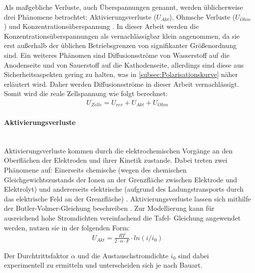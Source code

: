 Als maßgebliche Verluste, auch Überspannungen genannt, werden üblicherweise drei Phänomene betrachtet: Aktivierungsverluste ($U_{Akt}$), Ohmsche Verluste ($U_{Ohm}$) und Konzentrationsüberspannung \citep{falcao_review_2020}. In dieser Arbeit werden die Konzentrationsüberspannungen als vernachlässigbar klein angenommen, da sie erst außerhalb der üblichen Betriebsgrenzen von signifikanter Größenordnung sind. Ein weiteres Phänomen sind Diffusionsströme von Wasserstoff auf die Anodenseite und von Sauerstoff auf die Kathodenseite, allerdings sind diese aus Sicherheitsaspekten gering zu halten, was in \ref{subsec:Polarisationskurve} näher erläutert wird. Daher werden Diffusionsströme in dieser Arbeit vernachlässigt. Somit wird die reale Zellspannung wie folgt berechnet:\\

\begin{align}
	\label{gl:U_realEL}
	U_{Zelle} =  U_{rev} + U_{Akt} + U_{Ohm}
\end{align}   

\paragraph{Aktivierungsverluste}\ \\ 
Aktivierungsverluste kommen durch die elektrochemischen Vorgänge an den Oberflächen der Elektroden und ihrer Kinetik zustande. Dabei treten zwei Phänomene auf:  Einerseits chemische (wegen des chemischen Gleichgewichtszustands der Ionen an der Grenzfläche zwischen Elektrode und Elektrolyt) und andererseits elektrische (aufgrund des Ladungstransports durch das elektrische Feld an der Grenzfläche) \citep{stempien_solid_2013}. Aktivierungsverluste lassen sich mithilfe der Butler-Volmer-Gleichung beschreiben \citep{olivier_low-temperature_2017,stempien_solid_2013}. Zur Modellierung kann für ausreichend hohe Stromdichten vereinfachend die Tafel- Gleichung angewendet werden, \citet{abdin_modelling_2015} nutzen sie in der folgenden Form:\\

\begin{align}
	U_{Akt} = \frac{RT}{ 2 \cdot \alpha
		\cdot F} \cdot ln(i/i_0)
\label{gl:Akt}
\end{align}

Der Durchtrittsfaktor $\alpha$ und die Austauschstromdichte $i_0$ sind dabei experimentell zu ermitteln und unterscheiden sich je nach Bauart.\\

